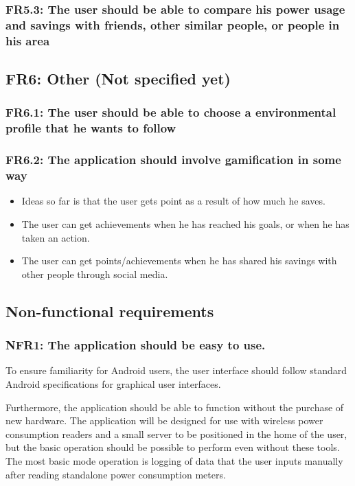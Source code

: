 \subsubsection{FR5.3: The user should be able to compare his power usage and savings with friends, other similar people, or people in his area}

\subsection{FR6: Other (Not specified yet)}
\subsubsection{FR6.1: The user should be able to choose a environmental profile that he wants to follow}
\subsubsection{FR6.2: The application should involve gamification in some way}
\begin{itemize}
\item Ideas so far is that the user gets point as a result of how much he saves.
\item The user can get achievements when he has reached his goals, or when he has taken an action.
\item The user can get points/achievements when he has shared his savings with other people through social media.
\end{itemize}


\subsection{Non-functional requirements}

\subsubsection{NFR1: The application should be easy to use.}
To ensure familiarity for Android users, the user interface should follow standard Android specifications for graphical user interfaces.
 
Furthermore, the application should be able to function without the purchase of new hardware. The application will be designed for use with wireless power consumption readers and a small server to be positioned in the home of the user, but the basic operation should be possible to perform even without these tools. The most basic mode operation is logging of data that 
the user inputs manually after reading standalone power consumption meters.
 
